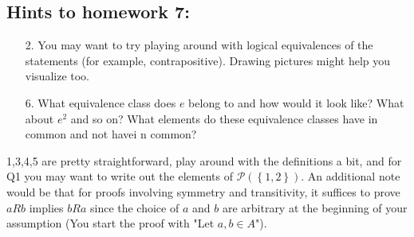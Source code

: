 \documentclass[letterpaper,12pt]{article}
\newcommand{\set}[1]{\left\{ #1 \right\}}
\begin{document}
\subsection*{Hints to homework 7:}
\begin{enumerate}
\item[2.] You may want to try playing around with logical equivalences of the statements (for example, contrapositive). Drawing pictures might help you visualize too.
\item[6.] What equivalence class does $e$ belong to and how would it look like? What about $e^2$ and so on? What elements do these equivalence classes have in common and not havei n common?
\end{enumerate}
1,3,4,5 are pretty straightforward, play around with the definitions a bit, and for Q1 you may want to write out the elements of $\mathcal{P}(\set{1,2})$. An additional note would be that for proofs involving symmetry and transitivity, it suffices to prove $aRb$ implies $bRa$ since the choice of $a$ and $b$ are arbitrary at the beginning of your assumption (You start the proof with "Let $a,b \in A$"). 
\end{document}
